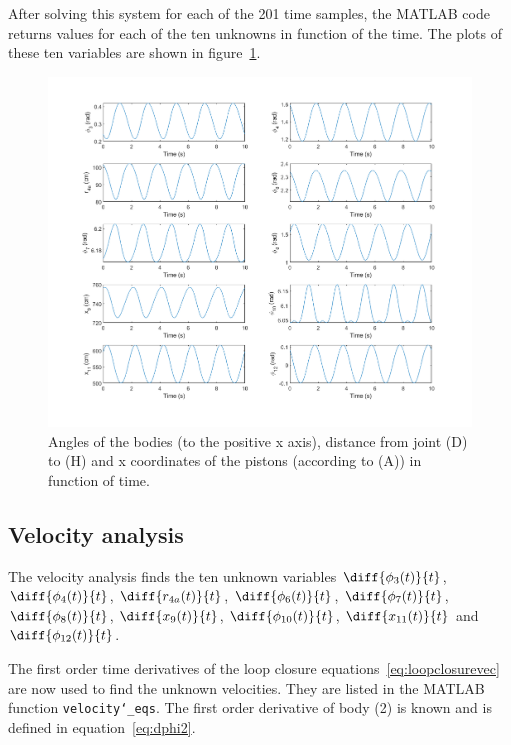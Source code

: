 \documentclass[a4paper]{article}
\begin{document}
After solving this system for each of the 201 time samples, the MATLAB code returns values for each of the ten unknowns in function of the time. The plots of these ten variables are shown in figure~\ref{fig:kinpos}.

\begin{figure}
	\centering
	
	\includegraphics[width = \textwidth]{kinpos.png}
	
	\caption{Angles of the bodies (to the positive x axis), distance from joint (D) to (H) and x coordinates of the pistons (according to (A)) in function of time.}
	\label{fig:kinpos}
	
\end{figure}



\subsection{Velocity analysis}

The velocity analysis finds the ten unknown variables \(\diff{\phi_3(t)}{t}\), \(\diff{\phi_4(t)}{t}\), \(\diff{r_{4a}(t)}{t}\), \(\diff{\phi_6(t)}{t}\), \(\diff{\phi_7(t)}{t}\), \(\diff{\phi_8(t)}{t}\), \(\diff{x_9(t)}{t}\), \(\diff{\phi_{10}(t)}{t}\), \(\diff{x_{11}(t)}{t}\) and \(\diff{\phi_{12}(t)}{t}\).

The first order time derivatives of the loop closure equations~\ref{eq:loopclosurevec} are now used to find the unknown velocities. They are listed in the MATLAB function \texttt{velocity\char`_eqs}. The first order derivative of body (2) is known and is defined in equation~\ref{eq:dphi2}. 
\end{document}

